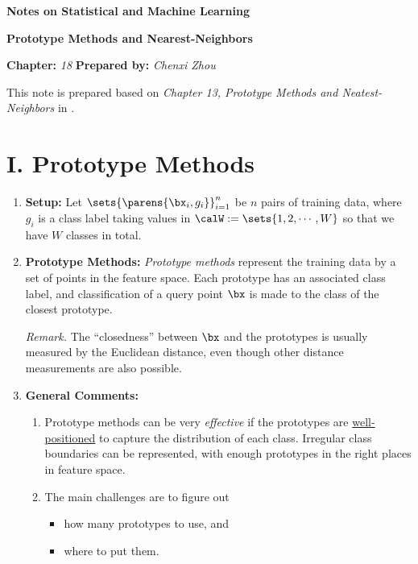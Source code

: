 \documentclass[12pt]{article}
\newcommand{\titlebox}[4]{
\begin{tcolorbox}[colback = blue!5!white!95, colframe = blue!70!black
]
  \noindent \textbf{ #1 } \hfill \textit{#2} 
  \begin{center}
  	 \LARGE{\textbf{#3}}
  \end{center}
\textbf{Chapter:} \textit{#4} \hfill \textbf{Prepared by:} \textit{Chenxi Zhou}
\end{tcolorbox}
}
\begin{document}
\titlebox{Notes on Statistical and Machine Learning}{}{Prototype Methods and Nearest-Neighbors}{18}
\thispagestyle{plain}

\vspace{10pt}

This note is prepared based on \textit{Chapter 13, Prototype Methods and Neatest-Neighbors} in \textcite{Friedman2001-np}. 

\section*{I. Prototype Methods} 

\begin{enumerate}[label=\textbf{\arabic*.}]

	\item \textbf{Setup:} Let $\sets{\parens{\bx_i, g_i}}_{i=1}^n$ be $n$ pairs of training data, where $g_i$ is a class label taking values in $\calW := \sets{1, 2, \cdots, W}$ so that we have $W$ classes in total. 
	
	\item \textbf{Prototype Methods:} \emph{Prototype methods} represent the training data by a set of points in the feature space. Each prototype has an associated class label, and classification of a query point $\bx$ is made to the class of the closest prototype. 
	
	\textit{Remark.} The ``closedness'' between $\bx$ and the prototypes is usually measured by the Euclidean distance, even though other distance measurements are also possible. 
	
	\item \textbf{General Comments:} 
	\begin{enumerate}
		\item Prototype methods can be very \emph{effective} if the prototypes are \underline{well-positioned} to capture the distribution of each class. Irregular class boundaries can be represented, with enough prototypes in the right places in feature space. 
		\item The main challenges are to figure out 
		\begin{itemize}
			\item how many prototypes to use, and 
			\item where to put them. 
		\end{itemize}
	\end{enumerate}
	

\end{enumerate}
\end{document}
